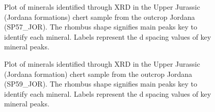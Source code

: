 \documentclass[
  a4paper,
  DIV=11,
  numbers=noendperiod]{scrreprt}
\begin{document}
\begin{figure}


\caption{\label{fig-xrd-sp57}Plot of minerals identified through XRD in
the Upper Jurassic (Jordana formations) chert sample from the outcrop
Jordana (SP57\_JOR). The rhombus shape signifies main peaks key to
identify each mineral. Labels represent the d spacing values of key
mineral peaks.}

\end{figure}%

\begin{figure}


\caption{\label{fig-xrd-sp59}Plot of minerals identified through XRD in
the Upper Jurassic (Jordana formation) chert sample from the outcrop
Jordana (SP59\_JOR). The rhombus shape signifies main peaks key to
identify each mineral. Labels represent the d spacing values of key
mineral peaks.}

\end{figure}%
\end{document}

